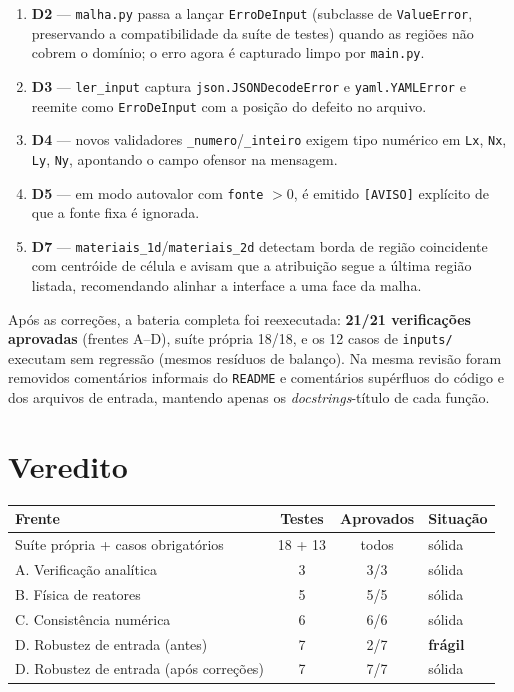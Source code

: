 \documentclass[11pt,a4paper]{article}
\begin{document}
\begin{enumerate}
  \item \textbf{D2} --- \texttt{malha.py} passa a lançar \texttt{ErroDeInput}
        (subclasse de \texttt{ValueError}, preservando a compatibilidade da
        suíte de testes) quando as regiões não cobrem o domínio; o erro agora é
        capturado limpo por \texttt{main.py}.
  \item \textbf{D3} --- \texttt{ler\_input} captura
        \texttt{json.JSONDecodeError} e \texttt{yaml.YAMLError} e reemite como
        \texttt{ErroDeInput} com a posição do defeito no arquivo.
  \item \textbf{D4} --- novos validadores \texttt{\_numero}/\texttt{\_inteiro}
        exigem tipo numérico em \texttt{Lx}, \texttt{Nx}, \texttt{Ly},
        \texttt{Ny}, apontando o campo ofensor na mensagem.
  \item \textbf{D5} --- em modo autovalor com \texttt{fonte} $> 0$, é emitido
        \texttt{[AVISO]} explícito de que a fonte fixa é ignorada.
  \item \textbf{D7} --- \texttt{materiais\_1d}/\texttt{materiais\_2d} detectam
        borda de região coincidente com centróide de célula e avisam que a
        atribuição segue a última região listada, recomendando alinhar a
        interface a uma face da malha.
\end{enumerate}

Após as correções, a bateria completa foi reexecutada:
\textbf{21/21 verificações aprovadas} (frentes A--D), suíte própria 18/18, e os
12 casos de \texttt{inputs/} executam sem regressão (mesmos resíduos de
balanço). Na mesma revisão foram removidos comentários informais do
\texttt{README} e comentários supérfluos do código e dos arquivos de entrada,
mantendo apenas os \emph{docstrings}-título de cada função.

\section{Veredito}

\begin{center}
\begin{tabular}{lccl}
\toprule
Frente & Testes & Aprovados & Situação \\
\midrule
Suíte própria + casos obrigatórios & 18 + 13 & todos & sólida \\
A. Verificação analítica & 3 & 3/3 & sólida \\
B. Física de reatores & 5 & 5/5 & sólida \\
C. Consistência numérica & 6 & 6/6 & sólida \\
D. Robustez de entrada (antes) & 7 & 2/7 & \textbf{frágil} \\
D. Robustez de entrada (após correções) & 7 & 7/7 & sólida \\
\bottomrule
\end{tabular}
\end{center}
\end{document}
